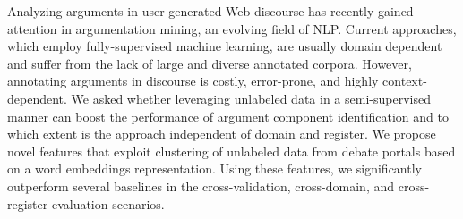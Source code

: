 Analyzing arguments in user-generated Web discourse has recently gained attention in argumentation mining, an evolving field of NLP. Current approaches, which employ fully-supervised machine learning, are usually domain dependent and suffer from the lack of large and diverse annotated corpora. However, annotating arguments in discourse is costly, error-prone, and highly context-dependent. We asked whether leveraging unlabeled data in a semi-supervised manner can boost the performance of argument component identification and to which extent is the approach independent of domain and register. We propose novel features that exploit clustering of unlabeled data from debate portals based on a word embeddings representation. Using these features, we significantly outperform several baselines in the cross-validation, cross-domain, and cross-register evaluation scenarios.
